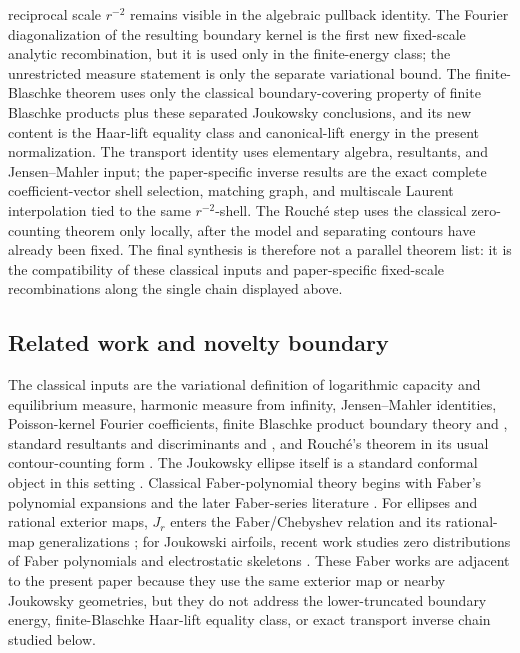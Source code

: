 reciprocal scale \(r^{-2}\) remains visible in the algebraic pullback
identity.  The Fourier diagonalization of the resulting boundary kernel is
the first new fixed-scale analytic recombination, but it is used only in
the finite-energy class; the unrestricted measure statement is only the
separate variational bound.  The finite-Blaschke theorem uses only the
classical boundary-covering property of finite Blaschke products plus these
separated Joukowsky conclusions, and its new content is the
Haar-lift equality class and canonical-lift energy in the present
normalization.  The transport identity uses elementary algebra, resultants,
and Jensen--Mahler input; the paper-specific inverse results are the
exact complete coefficient-vector shell selection, matching graph, and
multiscale Laurent interpolation tied to the same \(r^{-2}\)-shell.  The Rouch\'e step uses
the classical zero-counting theorem only locally, after the model and
separating contours have already been fixed.  The final synthesis is
therefore not a parallel theorem list: it is the compatibility of these
classical inputs and paper-specific fixed-scale recombinations along the
single chain displayed above.

\subsection*{Related work and novelty boundary}
The classical inputs are the variational definition of logarithmic
capacity and equilibrium measure, harmonic measure from infinity,
Jensen--Mahler identities, Poisson-kernel Fourier coefficients,
finite Blaschke product boundary theory
\citep[Sec.~1.2]{Duren1970} and \citep{Colwell1985}, standard resultants
and discriminants \citep[Chap.~12]{GKZ1994} and \citep{CoxLittleOShea2005}, and
Rouch\'e's theorem in its usual contour-counting form
\citep[pp.~152--153]{Ahlfors1979}.  The Joukowsky ellipse itself is a
standard conformal object in this setting
\citep{Landkof1972,Pommerenke1992,Tsuji1959,Ransford1995,SaffTotik1997,StahlTotik1992}.
Classical Faber-polynomial theory begins with Faber's polynomial
expansions and the later Faber-series literature
\citep{Faber1903,Curtiss1971,Suetin1998}.  For ellipses and rational exterior
maps, \(J_r\) enters the Faber/Chebyshev relation and its rational-map
generalizations \citep{Liesen2001}; for Joukowski airfoils, recent
work studies zero distributions of Faber polynomials and electrostatic
skeletons \citep{LevenbergWielonsky2020}.  These
Faber works are adjacent to the present paper because they use the
same exterior map or nearby Joukowsky geometries, but they do not
address the lower-truncated boundary energy, finite-Blaschke
Haar-lift equality class, or exact transport inverse chain studied
below.

